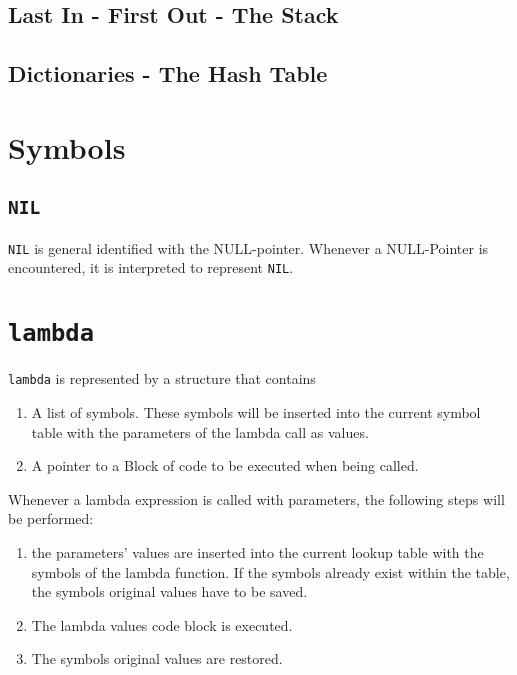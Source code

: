 \documentclass[12pt]{article}
\begin{document}
\subsection{Last In - First Out - The Stack}

\subsection{Dictionaries - The Hash Table}


\section{Symbols}

\subsection{\texttt{NIL}}

\texttt{NIL} is general identified with the NULL-pointer. Whenever a
NULL-Pointer is encountered, it is interpreted to represent \texttt{NIL}.


\section{\texttt{lambda}}

\texttt{lambda} is represented by a structure that contains 

\begin{enumerate}
\item A list of symbols. These symbols will be inserted into the current symbol
table with the parameters of the lambda call as values. 
\item A pointer to a Block of code to be executed when being called.
\end{enumerate}

Whenever a lambda expression is called with parameters, the following steps will
be performed:

\begin{enumerate}
\item  the parameters' values are inserted into the current lookup table  with the 
symbols of the lambda function. If the symbols already exist within the table,
the symbols original values have to be saved.
\item The lambda values code block is executed.
\item The symbols original values are restored.
\end{enumerate}
\end{document}

